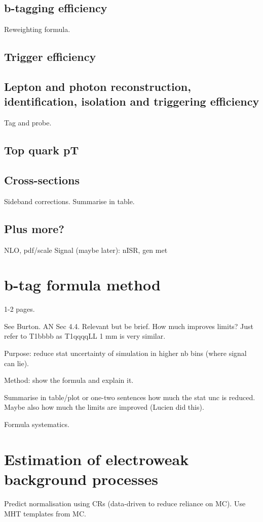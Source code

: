 \subsection{b-tagging efficiency}
Reweighting formula.
\subsection{Trigger efficiency}
\subsection{Lepton and photon reconstruction, identification, isolation and 
triggering efficiency}
Tag and probe.
\subsection{Top quark pT}
\subsection{Cross-sections}
Sideband corrections.
Summarise in table.

\subsection{Plus more?}
NLO, pdf/scale
Signal (maybe later): nISR, gen met

\section{b-tag formula method}
1-2 pages.

See Burton. AN Sec 4.4.
Relevant but be brief.
How much improves limits? Just refer to T1bbbb as T1qqqqLL 1 mm is very similar.

Purpose: reduce stat uncertainty of simulation in higher nb bins (where signal 
can lie).

Method: show the formula and explain it.

Summarise in table/plot or one-two sentences how much the stat unc is reduced. 
Maybe also how much the limits are improved (Lucien did this).

Formula systematics.

\section{Estimation of electroweak background processes}
Predict normalisation using CRs (data-driven to reduce reliance on MC). Use MHT 
templates from MC.

